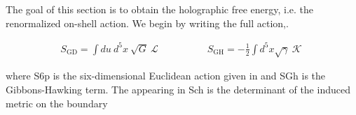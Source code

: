 \documentclass{article}
\begin{document}
The goal of this section is to obtain the holographic free energy, i.e. the renormalized on-shell
action. We begin by writing the full action,.


\begin{equation}
\begin{array} { r } { S _ { \mathrm { G D } } = \int d u ~ d ^ { 5 } x ~ \sqrt { G } ~ \mathcal { L } \qquad \qquad \quad S _ { \mathrm { G H } } = - \frac { 1 } { 2 } \int d ^ { 5 } x \sqrt { \gamma } ~ \mathcal { K } ~ }\end{array}
\end{equation}


where S6p is the six-dimensional Euclidean action given in and SGh is the Gibbons-Hawking
term. The  appearing in Sch is the determinant of the induced metric on the boundary
\end{document}

